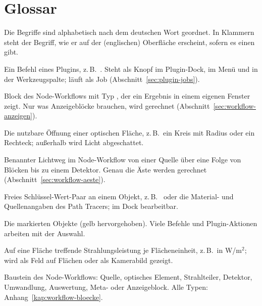 \chapter{Glossar}\label{kap:glossar}

Die Begriffe sind alphabetisch nach dem deutschen Wort geordnet. In Klammern steht der Begriff,
wie er auf der (englischen) Oberfläche erscheint, sofern es einen gibt.

\begin{description}[style=nextline,leftmargin=1.5em,font=\normalfont\bfseries]

\item[Aktion (action)] Ein Befehl eines Plugins, z.\,B.\ . Steht als Knopf im
  Plugin-Dock, im Menü  und in der Werkzeugspalte; läuft als Job
  (Abschnitt~\ref{sec:plugin-jobs}).

\item[Anzeigeblock (display block)] Block des Node-Workflows mit Typ , der ein
  Ergebnis in einem eigenen Fenster zeigt. Nur was Anzeigeblöcke brauchen, wird gerechnet
  (Abschnitt~\ref{sec:workflow-anzeigen}).

\item[Apertur (aperture)] Die nutzbare Öffnung einer optischen Fläche, z.\,B.\ ein Kreis mit
  Radius oder ein Rechteck; außerhalb wird Licht abgeschattet.

\item[Ast (branch)] Benannter Lichtweg im Node-Workflow von einer Quelle über eine Folge von
  Blöcken bis zu einem Detektor. Genau die Äste werden gerechnet (Abschnitt~\ref{sec:workflow-aeste}).

\item[Attribut (attribute)] Freies Schlüssel-Wert-Paar an einem Objekt, z.\,B.\
   oder die Material- und Quellenangaben des Path Tracers; im Dock
  \gui{Properties} bearbeitbar.

\item[Auswahl (selection)] Die markierten Objekte (gelb hervorgehoben). Viele Befehle und
  Plugin-Aktionen arbeiten mit der Auswahl.

\item[Bestrahlungsstärke (irradiance)] Auf eine Fläche treffende Strahlungsleistung je
  Flächeneinheit, z.\,B.\ in W/m$^2$; wird als Feld auf Flächen oder als Kamerabild gezeigt.

\item[Block (block, node)] Baustein des Node-Workflows: Quelle, optisches Element, Strahlteiler,
  Detektor, Umwandlung, Auswertung, Meta- oder Anzeigeblock. Alle Typen: Anhang~\ref{kap:workflow-bloecke}.


\end{description}
